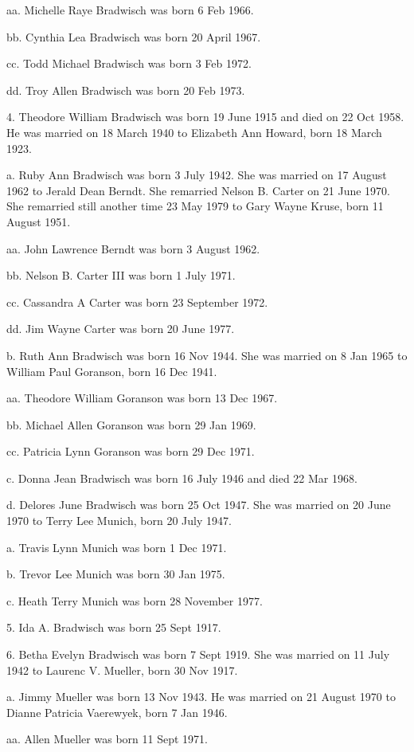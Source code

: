 \documentclass[a4paper]{article}
\begin{document}
aa. Michelle Raye Bradwisch was born 6 Feb 1966.

bb. Cynthia Lea Bradwisch was born 20 April 1967.

cc. Todd Michael Bradwisch was born 3 Feb 1972.

dd. Troy Allen Bradwisch was born 20 Feb 1973.

4. Theodore William Bradwisch was born 19 June 1915 and died on 22 Oct 1958. He was married on 18 March 1940 to Elizabeth Ann Howard, born 18 March 1923.

a. Ruby Ann Bradwisch was born 3 July 1942.  She was married on 17 August 1962 to Jerald Dean Berndt. She remarried Nelson B. Carter on 21 June 1970.  She remarried still another time 23 May 1979 to Gary Wayne Kruse, born 11 August 1951.  

aa. John Lawrence Berndt was born 3 August 1962.

bb. Nelson B. Carter III was born 1 July 1971.

cc. Cassandra A Carter was born 23 September 1972.

dd. Jim Wayne Carter was born 20 June 1977.

b. Ruth Ann Bradwisch was born 16 Nov 1944.  She was married on 8 Jan 1965 to William Paul Goranson, born 16 Dec 1941.
 
aa. Theodore William Goranson was born 13 Dec 1967.

bb. Michael Allen Goranson was born 29 Jan 1969.

cc. Patricia Lynn Goranson was born 29 Dec 1971.

c. Donna Jean Bradwisch was born 16 July 1946 and died 22 Mar 1968.

d. Delores June Bradwisch was born 25 Oct 1947.  She was married on 20 June 1970 to Terry Lee Munich, born 20 July 1947.
 
a. Travis Lynn Munich was born 1 Dec 1971.

b. Trevor Lee Munich was born 30 Jan 1975.

c. Heath Terry Munich was born 28 November 1977.

5. Ida A. Bradwisch was born 25 Sept 1917.

6. Betha Evelyn Bradwisch was born 7 Sept 1919.  She was married on 11 July 1942 to Laurenc V. Mueller, born 30 Nov 1917.

a. Jimmy Mueller was born 13 Nov 1943.  He was married on 21 August 1970 to Dianne Patricia Vaerewyek, born 7 Jan 1946.
 
aa. Allen Mueller was born 11 Sept 1971.
 
\end{document}
